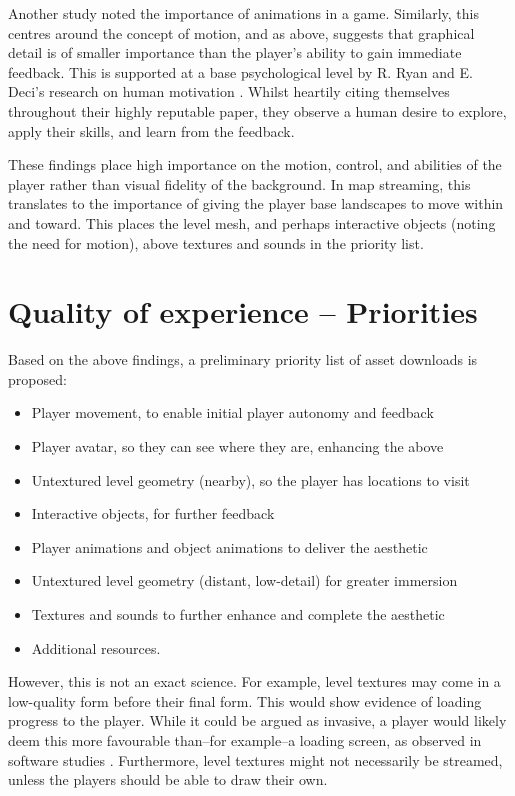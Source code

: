 \documentclass{scrartcl}
\begin{document}
Another study \cite{graphicsvsexperience} noted the importance of animations in a game. Similarly, this centres around the concept of motion, and as above, suggests that graphical detail is of smaller importance than the player's ability to gain immediate feedback. This is supported at a base psychological level by R. Ryan and E. Deci's research on human motivation \cite{motivation}. Whilst heartily citing themselves throughout their highly reputable paper, they observe a human desire to explore, apply their skills, and learn from the feedback.

These findings place high importance on the motion, control, and abilities of the player rather than visual fidelity of the background. In map streaming, this translates to the importance of giving the player base landscapes to move within and toward. This places the level mesh, and perhaps interactive objects (noting the need for motion), above textures and sounds in the priority list.

\section{Quality of experience -- Priorities}
Based on the above findings, a preliminary priority list of asset downloads is proposed:

\begin{itemize}
	\item Player movement, to enable initial player autonomy and feedback \cite{motivation}
	\item Player avatar, so they can see where they are, enhancing the above
	\item Untextured level geometry (nearby), so the player has locations to visit
	\item Interactive objects, for further feedback
	\item Player animations and object animations to deliver the aesthetic \cite{graphicsvsexperience}
	\item Untextured level geometry (distant, low-detail) for greater immersion
	\item Textures and sounds to further enhance and complete the aesthetic
	\item Additional resources.
\end{itemize}

However, this is not an exact science. For example, level textures may come in a low-quality form before their final form. This would show evidence of loading progress to the player. While it could be argued as invasive, a player would likely deem this more favourable than--for example--a loading screen, as observed in software studies \cite{loadingscreens}. Furthermore, level textures might not necessarily be streamed, unless the players should be able to draw their own.
\end{document}
